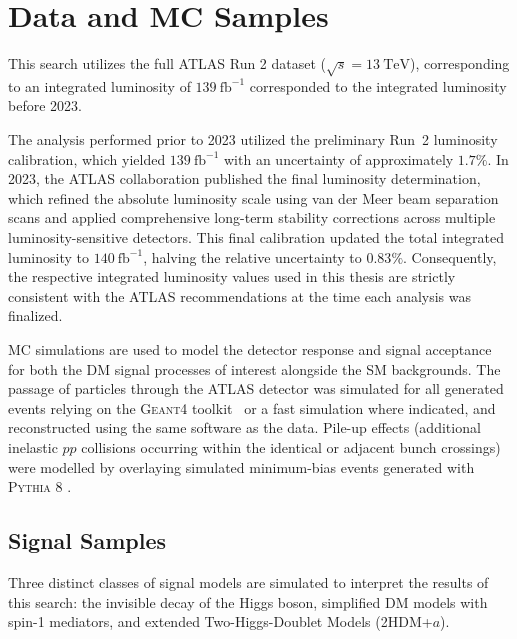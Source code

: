 \section{Data and MC Samples}
\label{sec:monoZ_samples}

This search utilizes the full ATLAS Run 2 dataset ($\sqrt{s}=13~\text{TeV}$), corresponding to an integrated luminosity of $139~\text{fb}^{-1}$ corresponded to the integrated luminosity before 2023. 

The analysis performed prior to 2023 utilized the preliminary Run~2 luminosity calibration, which yielded $139~\mathrm{fb}^{-1}$ with an uncertainty of approximately $1.7\%$. In 2023, the ATLAS collaboration published the final luminosity determination, which refined the absolute luminosity scale using van der Meer beam separation scans and applied comprehensive long-term stability corrections across multiple luminosity-sensitive detectors. This final calibration updated the total integrated luminosity to $140 ~\mathrm{fb}^{-1}$, halving the relative uncertainty to $0.83\%$. Consequently, the respective integrated luminosity values used in this thesis are strictly consistent with the ATLAS recommendations at the time each analysis was finalized.

MC simulations are used to model the detector response and signal acceptance for both the DM signal processes of interest alongside the SM backgrounds. The passage of particles through the ATLAS detector was simulated for all generated events relying on the \textsc{Geant4} toolkit~\cite{GEANT4:2002zbu} or a fast simulation where indicated, and reconstructed using the same software as the data. Pile-up effects (additional inelastic $pp$ collisions occurring within the identical or adjacent bunch crossings) were modelled by overlaying simulated minimum-bias events generated with \textsc{Pythia} 8 \cite{Sjostrand:2007gs}.

\subsection{Signal Samples}
\label{subsec:signal_samples}

Three distinct classes of signal models are simulated to interpret the results of this search: the invisible decay of the Higgs boson, simplified DM models with spin-1 mediators, and extended Two-Higgs-Doublet Models (2HDM+$a$).

